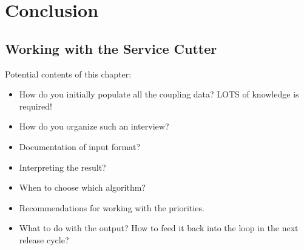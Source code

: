 \chapter{Conclusion}


\section{Working with the Service Cutter}

Potential contents of this chapter:

\begin{itemize}
\item How do you initially populate all the coupling data? LOTS of knowledge is required!
\item How do you organize such an interview?
\item Documentation of input format?
\item Interpreting the result?
\item When to choose which algorithm?
\item Recommendations for working with the priorities.
\item What to do with the output? How to feed it back into the loop in the next release cycle?
\end{itemize}
